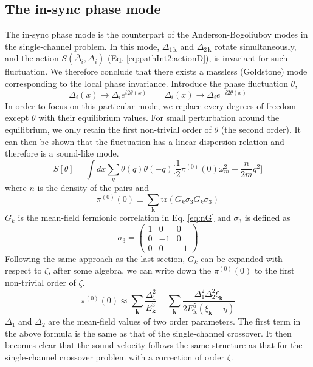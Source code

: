 \documentclass[reprint,pra]{revtex4-1}
\newcommand{\vk}{\ensuremath{\mathbf{k}}}
\newcommand{\nth}[1]{\ensuremath{\frac{1}{#1}}}
\newcommand{\br}[1]{\ensuremath{\left(#1\right)}}
\newcommand{\mtrx}[1]{\ensuremath{\begin{pmatrix}#1\end{pmatrix}}}
\newcommand{\tr}{\ensuremath{\text{tr}}}
\begin{document}
\subsection{The in-sync phase mode\label{sec:insync}}
The in-sync phase mode is the counterpart of the Anderson-Bogoliubov modes in the single-channel problem\cite{RanderiaBEC, Nagaosa}. %
In this mode,  $\Delta_{1\,\vk}$ and $\Delta_{2\,\vk}$ rotate simultaneously, and the action $S(\bar{\Delta}_i,\Delta_i)$ (Eq. \ref{eq:pathInt2:actionD}), is invariant for such fluctuation.  
 We therefore conclude that there exists a massless (Goldstone) mode corresponding to the local phase invariance.  Introduce the phase fluctuation $\theta$, 
\begin{equation*}
\Delta_{i}(x)\rightarrow{}\Delta_{i}e^{i2\theta(x)}\qquad{}
\bar{\Delta}_{i}(x)\rightarrow{}\bar{\Delta}_{i}e^{-i2\theta(x)}
\end{equation*}
In order to focus on this particular mode, we  replace every  degrees of freedom except $\theta$ with their equilibrium values.  For small perturbation around the equilibrium, we only retain the first non-trivial order of $\theta$ (the second order).  It can then be shown that the fluctuation has a linear dispersion relation and therefore is a sound-like mode.   
\begin{equation}
S[\theta]=\int{dx}\sum_{q}\theta(q)\theta(-q)\big[\nth{2}\pi^{(0)}(0)\omega_m^2-\frac{n}{2m}q^2\big]
\end{equation}
where $n$ is the density of the pairs and 
\begin{equation}
\pi^{(0)}(0)\equiv\sum_{\vk}\tr\br{G_{k}\sigma_3G_{k}\sigma_3}
\end{equation}
$G_{k}$ is the mean-field fermionic correlation in Eq. \ref{eq:nG} and $\sigma_3$ is defined as 
\begin{equation}
\sigma_3=\mtrx{1&0&0\\0&-1&0\\0&0&-1}
\end{equation}
Following the same approach as the last section, $G_{k}$ can be expanded with respect  to $\zeta$, after some algebra, we can write down the $\pi^{(0)}(0)$ to the first non-trivial order of $\zeta$.
\begin{equation}
\pi^{(0)}(0)\approx\sum_{\vk}\frac{\Delta_{1}^{2}}{E_{\vk}^{3}}
	-\sum_{\vk}\frac{\Delta_{1}^{2}\Delta_{2}^{2}\xi_{\vk}}{2E_{\vk}^{5}(\xi_{\vk}+\eta)}
\label{eq:pathInt2:pi0}
\end{equation}
$\Delta_1$ and $\Delta_2$ are the mean-field values of two order parameters. 
The first term in the above formula is the same as that of the single-channel crossover\cite{RanderiaBEC}.   It then becomes clear that the sound velocity follows the same structure as that for the single-channel crossover problem  with a correction of order  $\zeta$.
\end{document}
